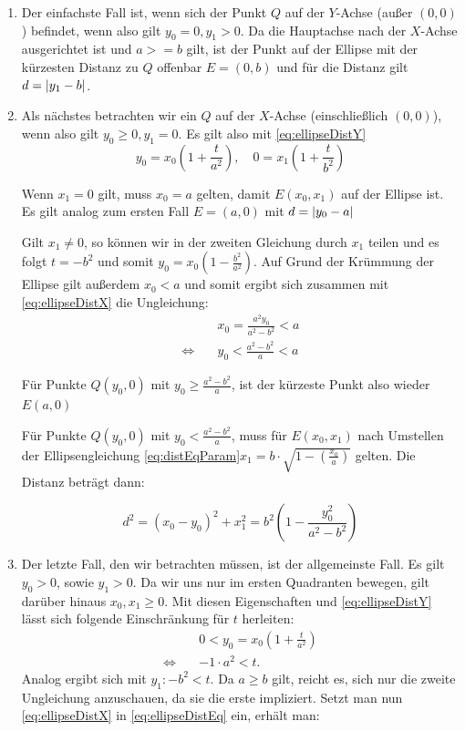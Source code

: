 \begin{enumerate}
	\item Der einfachste Fall ist, wenn sich der Punkt $Q$ auf der $Y$-Achse (außer $(0,0)$) befindet, wenn also gilt $y_0 = 0, y_1 > 0$.
	Da die Hauptachse nach der $X$-Achse ausgerichtet ist und $a >= b$ gilt, ist der Punkt auf der Ellipse mit der kürzesten Distanz zu $Q$ offenbar $E = (0, b)$ und für die Distanz gilt $d = \lvert y_1 - b\rvert$.
	\item Als nächstes betrachten wir ein $Q$ auf der $X$-Achse (einschließlich $(0,0)$), wenn also gilt  $y_0 \geq 0, y_1 = 0$. Es gilt also mit \ref{eq:ellipseDistY}
	\[
		y_0 = x_0\left(1 + \frac{t}{a^2}\right), \quad 0 = x_1\left(1 + \frac{t}{b^2}\right)
	\]
	
	Wenn $x_1 = 0$ gilt, muss $x_0 = a$ gelten, damit $E(x_0,x_1)$ auf der Ellipse ist. Es  gilt analog zum ersten Fall $E=(a,0)$ mit $d = \lvert y_0 - a\rvert$ 
	
	Gilt $x_1 \neq 0$, so können wir in der zweiten Gleichung durch $x_1$ teilen und es folgt $t = -b^2$ und somit $y_0 = x_0\left(1 - \frac{b^2}{a^2}\right)$. Auf Grund der Krümmung der Ellipse gilt außerdem $x_0 < a$ und somit ergibt sich zusammen mit \ref{eq:ellipseDistX} die Ungleichung:
	\begin{equation*}
	\begin{aligned}
		&x_0 = \frac{a^2y_0}{a^2 - b^2} < a \\
		\Leftrightarrow\quad &y_0 < \frac{a^2 - b^2}{a} < a
	\end{aligned}
	\end{equation*}
		
	Für Punkte $Q(y_0,0)$ mit $y_0 \geq \frac{a^2 - b^2}{a}$, ist der kürzeste Punkt also wieder $E(a,0)$
	
	Für Punkte $Q(y_0,0)$ mit $y_0 < \frac{a^2 - b^2}{a}$, muss für $E(x_0,x_1)$ nach Umstellen der Ellipsengleichung \ref{eq:distEqParam}\quad$x_1 = b\cdot\sqrt{1-\left(\frac{x_0}{a}\right)}$ gelten. 
	Die Distanz beträgt dann:

	\[
		d^2 = (x_0 - y_0)^2 + x_1^2 = b^2\left(1 - \frac{y_0^2}{a^2 - b^2}\right)
	\]
	\item Der letzte Fall, den wir betrachten müssen, ist der allgemeinste Fall. Es gilt $y_0 > 0$, sowie $y_1 > 0$. Da wir uns nur im ersten Quadranten bewegen, gilt darüber hinaus $x_0, x_1 \geq 0$. Mit diesen Eigenschaften und \ref{eq:ellipseDistY} lässt sich folgende Einschränkung für $t$ herleiten:
	\begin{equation}
	\begin{aligned}
	& 0 < y_0 = x_0\left(1 + \frac{t}{a^2}\right)\\
	\Leftrightarrow\quad& -1\cdot a^2 < t.
	\end{aligned}
	\end{equation}
	Analog ergibt sich mit $y_1\colon -b^2 < t$. Da $a\geq b$ gilt, reicht es, sich nur die zweite Ungleichung anzuschauen, da sie die erste impliziert. Setzt man nun \ref{eq:ellipseDistX} in \ref{eq:ellipseDistEq} ein, erhält man:
	

\end{enumerate}
